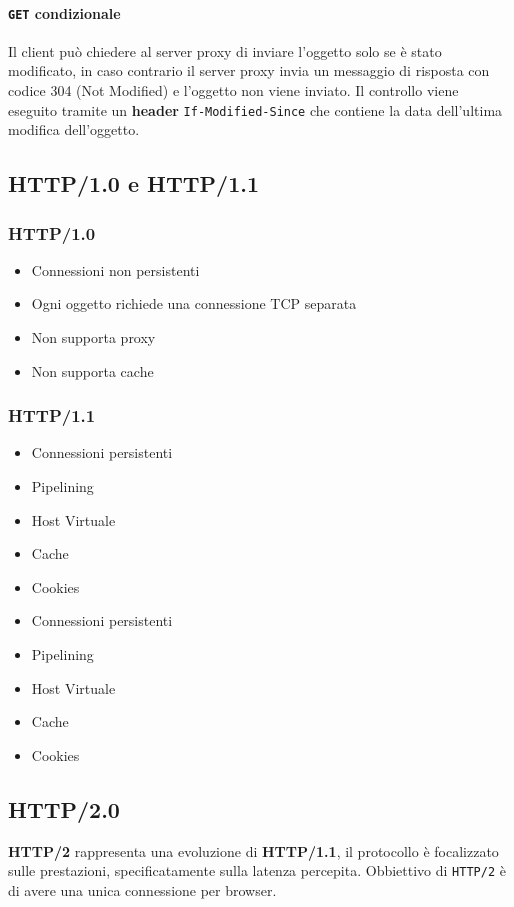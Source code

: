         \paragraph{\texttt{GET} condizionale} Il client può chiedere al server proxy di inviare l'oggetto solo se è stato modificato, in caso contrario il server proxy invia un messaggio di risposta con codice 304 (Not Modified) e l'oggetto non viene inviato. Il controllo viene eseguito tramite un \textbf{header} \texttt{If-Modified-Since} che contiene la data dell'ultima modifica dell'oggetto.
    \subsection{HTTP/1.0 e HTTP/1.1}
        \subsubsection{HTTP/1.0}
            \begin{itemize}
                \item Connessioni non persistenti
                \item Ogni oggetto richiede una connessione TCP separata
                \item Non supporta proxy
                \item Non supporta cache
            \end{itemize}
        \subsubsection{HTTP/1.1}
            \begin{itemize}
                \item Connessioni persistenti
                \item Pipelining
                \item Host Virtuale
                \item Cache
                \item Cookies
                \item Connessioni persistenti
                \item Pipelining
                \item Host Virtuale
                \item Cache
                \item Cookies
            \end{itemize}
    \subsection{HTTP/2.0}
        \textbf{HTTP/2} rappresenta una evoluzione di \textbf{HTTP/1.1}, il protocollo è focalizzato sulle prestazioni, specificatamente sulla latenza percepita. Obbiettivo di \texttt{HTTP/2} è di avere una unica connessione per browser.

